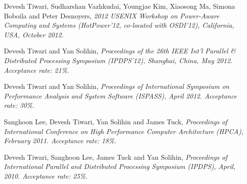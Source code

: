 {\textnormal{\newline Devesh Tiwari, Sudharshan Vazhkudai, Youngjae Kim, Xiaosong Ma, Simona Boboila and Peter Desnoyers,\textit{ 2012 USENIX Workshop on Power-Aware Computing and Systems (HotPower'12, co-located with OSDI'12), California, USA, October 2012.\newline}}}{}{}{}

{\textnormal{\newline Devesh Tiwari and Yan Solihin,\textit{ Proceedings of the 26th IEEE Int'l Parallel \& Distributed Processing Symposium (IPDPS'12), Shanghai, China, May 2012. Acceptance rate: 21\%.\newline}}}{}{}{}

{\textnormal{\newline Devesh Tiwari and Yan Solihin,\textit{ Proceedings of International Symposium on Performance Analysis and System Software (ISPASS), April 2012. Acceptance rate: 30\%.\newline}}}{}{}{}

{\textnormal{\newline Sanghoon Lee, Devesh Tiwari, Yan Solihin and James Tuck,\textit{  Proceedings of International Conference on High Performance Computer Architecture (HPCA), February 2011. Acceptance rate: 18\%.\newline}}}{}{}{}

{\textnormal{\newline Devesh Tiwari, Sanghoon Lee, James Tuck and Yan Solihin,\textit{   Proceedings of International Parallel and Distributed Processing Symposium (IPDPS), April, 2010. Acceptance rate: 25\%.\newline}}}{}{}{}

